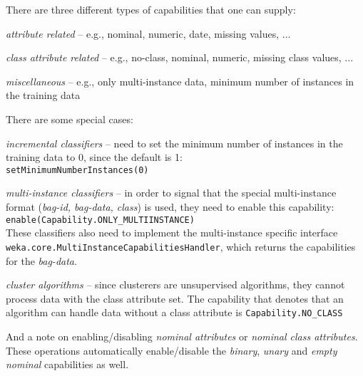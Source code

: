 \noindent There are three different types of capabilities that one can supply:
\begin{tight_enumerate}
  \item \textit{attribute related} -- e.g., nominal, numeric, date, missing
values, ...
  \item \textit{class attribute related} -- e.g., no-class, nominal, numeric,
missing class values, ...
  \item \textit{miscellaneous} -- e.g., only multi-instance data, minimum number
of instances in the training data
\end{tight_enumerate}
There are some special cases:
\begin{tight_itemize}
  \item \textit{incremental classifiers} -- need to set the minimum number of
instances in the training data to 0, since the default is 1: \\
  \texttt{setMinimumNumberInstances(0)}
  
  \item \textit{multi-instance classifiers} -- in order to signal that the
special multi-instance format (\textit{bag-id, bag-data, class}) is used, they
need to enable this capability: \\
  \texttt{enable(Capability.ONLY\_MULTIINSTANCE)} \\
  These classifiers also need to implement the multi-instance specific interface
\texttt{weka.core.MultiInstanceCapabilitiesHandler}, which returns the
capabilities for the \textit{bag-data}.

  \item \textit{cluster algorithms} -- since clusterers are unsupervised
algorithms, they cannot process data with the class attribute set. The
capability that denotes that an algorithm can handle data without a class
attribute is \texttt{Capability.NO\_CLASS}
\end{tight_itemize}
And a note on enabling/disabling \textit{nominal attributes} or \textit{nominal
class attributes}. These operations automatically enable/disable the
\textit{binary}, \textit{unary} and \textit{empty nominal} capabilities as well.

\newpage
